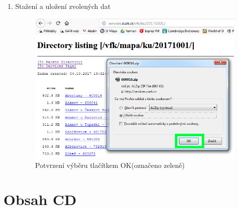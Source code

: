 \begin{enumerate}
  \item{Stažení a uložení zvolených dat}
  \begin{figure}[H]
	 \centering
      \includegraphics[width=15cm]{./pictures/stazeni_dat_5kr.png}
      \caption{Potvrzení výběru tlačítkem OK(označeno zeleně)}
      \label{fig:5kr_stazeni}
  \end{figure}
  \end{enumerate}
  
 \section{Obsah CD}